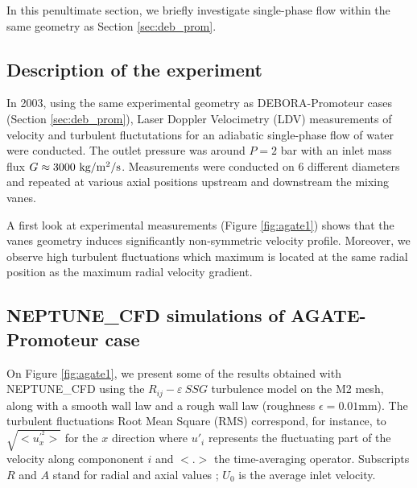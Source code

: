 In this penultimate section, we briefly investigate single-phase flow within the same geometry as Section \ref{sec:deb_prom}.

\subsection{Description of the experiment}

In 2003, using the same experimental geometry as DEBORA-Promoteur cases (Section \ref{sec:deb_prom}), Laser Doppler Velocimetry (LDV) measurements of velocity and turbulent fluctutations for an adiabatic single-phase flow of water were conducted. The outlet pressure was around $P=2$ bar with an inlet mass flux $G\approx 3000~\text{kg/m$^{2}$/s}$. Measurements were conducted on $6$ different diameters and repeated at various axial positions upstream and downstream the mixing vanes.

A first look at experimental measurements (Figure \ref{fig:agate1}) shows that the vanes geometry induces significantly non-symmetric velocity profile. Moreover, we observe high turbulent fluctuations which maximum is located at the same radial position as the maximum radial velocity gradient.

\subsection{NEPTUNE\_CFD simulations of AGATE-Promoteur case}

On Figure \ref{fig:agate1}, we present some of the results obtained with NEPTUNE\_CFD using the $R_{ij}-\varepsilon~SSG$ turbulence model on the M2 mesh, along with a smooth wall law and a rough wall law (roughness $\epsilon=0.01$mm). The turbulent fluctuations Root Mean Square (RMS) correspond, for instance, to $\sqrt{<u^{'^{2}}_{x}>}$ for the $x$ direction where $u'_{i}$ represents the fluctuating part of the velocity along compononent $i$ and $<.>$ the time-averaging operator. Subscripts $R$ and $A$ stand for radial and axial values ; $U_{0}$ is the average inlet velocity.


